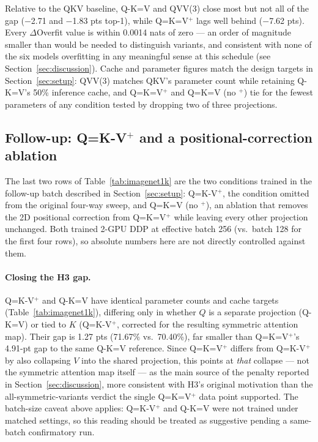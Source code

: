 \documentclass[11pt]{article}
\begin{document}
Relative to the QKV baseline, Q-K=V and QVV(3) close most but not all of the
gap (\(-\)2.71 and \(-\)1.83 pts top-1), while Q=K=V\(^+\) lags well behind
(\(-\)7.62 pts). Every \(\Delta\)Overfit value is within 0.0014 nats of zero
--- an order of magnitude smaller than would be needed to distinguish
variants, and consistent with none of the six models overfitting in any
meaningful sense at this schedule (see Section~\ref{sec:discussion}).
Cache and parameter figures match the design targets in
Section~\ref{sec:setup}: QVV(3) matches QKV's parameter count while
retaining Q-K=V's 50\% inference cache, and Q=K=V\(^+\) and Q=K=V (no
\(^+\)) tie for the fewest parameters of any condition tested by dropping
two of three projections.

\subsection{Follow-up: Q=K-V\(^+\) and a positional-correction ablation}
\label{sec:followup}
The last two rows of Table~\ref{tab:imagenet1k} are the two conditions
trained in the follow-up batch described in Section~\ref{sec:setup}:
Q=K-V\(^+\), the condition omitted from the original four-way sweep, and
Q=K=V (no \(^+\)), an ablation that removes the 2D positional correction
from Q=K=V\(^+\) while leaving every other projection unchanged. Both
trained 2-GPU DDP at effective batch 256 (vs.\ batch 128 for the first four
rows), so absolute numbers here are not directly controlled against them.

\paragraph{Closing the H3 gap.} Q=K-V\(^+\) and Q-K=V have identical
parameter counts and cache targets (Table~\ref{tab:imagenet1k}), differing
only in whether \(Q\) is a separate projection (Q-K=V) or tied to \(K\)
(Q=K-V\(^+\), corrected for the resulting symmetric attention map). Their
gap is 1.27 pts (71.67\% vs.\ 70.40\%), far smaller than Q=K=V\(^+\)'s 4.91-pt
gap to the same Q-K=V reference. Since Q=K=V\(^+\) differs from Q=K-V\(^+\)
by also collapsing \(V\) into the shared projection, this points at
\emph{that} collapse --- not the symmetric attention map itself --- as the
main source of the penalty reported in Section~\ref{sec:discussion}, more
consistent with H3's original motivation than the all-symmetric-variants
verdict the single Q=K=V\(^+\) data point supported. The batch-size caveat
above applies: Q=K-V\(^+\) and Q-K=V were not trained under matched
settings, so this reading should be treated as suggestive pending a
same-batch confirmatory run.
\end{document}
